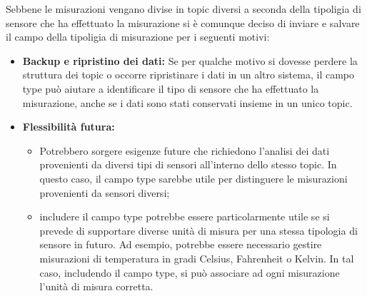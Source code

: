 Sebbene le misurazioni vengano divise in topic diversi a seconda della tipoligia di sensore che ha effettuato la misurazione si è comunque deciso di inviare e salvare il campo della tipoligia di misurazione per i seguenti motivi:
\begin{itemize}
    \item \textbf{Backup e ripristino dei dati:} Se per qualche motivo si dovesse perdere la struttura dei topic o occorre ripristinare i dati in un altro sistema, il campo type può aiutare a identificare il tipo di sensore che ha effettuato la misurazione, anche se i dati sono stati conservati insieme in un unico topic.
    \item \textbf{Flessibilità futura:} 
    \begin{itemize}
        \item Potrebbero sorgere esigenze future che richiedono l'analisi dei dati provenienti da diversi tipi di sensori all'interno dello stesso topic. In questo caso, il campo type sarebbe utile per distinguere le misurazioni provenienti da sensori diversi;
        \item includere il campo type potrebbe essere particolarmente utile se si prevede di supportare diverse unità di misura per una stessa tipologia di sensore in futuro. Ad esempio, potrebbe essere necessario gestire misurazioni di temperatura in gradi Celsius, Fahrenheit o Kelvin. In tal caso, includendo il campo type, si può associare ad ogni misurazione l'unità di misura corretta.
    \end{itemize}
\end{itemize}
    
